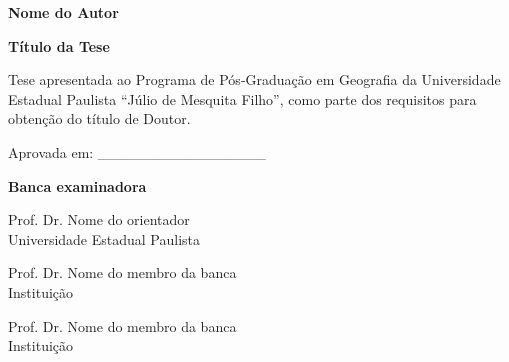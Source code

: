 \begin{folhadeaprovacao}

\begin{center}
{\large \textbf{Nome do Autor}}
\end{center}

\vspace{2cm}

\begin{center}
{\large \textbf{Título da Tese}}
\end{center}

\vspace{2cm}

Tese apresentada ao Programa de Pós-Graduação em Geografia da Universidade Estadual Paulista ``Júlio de Mesquita Filho'', como parte dos requisitos para obtenção do título de Doutor.

\vspace{2cm}

Aprovada em: \_\_\_\_\_\_\_\_\_\_\_\_\_\_\_\_

\vspace{2cm}

\begin{center}

\textbf{Banca examinadora}

\vspace{1cm}

Prof. Dr. Nome do orientador\\
Universidade Estadual Paulista

\vspace{1cm}

Prof. Dr. Nome do membro da banca\\
Instituição

\vspace{1cm}

Prof. Dr. Nome do membro da banca\\
Instituição

\end{center}

\end{folhadeaprovacao}

\cleardoublepage